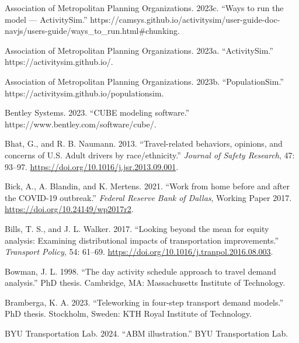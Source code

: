 \documentclass[fancy, twoside, mastersfancy, ms]{byuthesis}
\newlength{\cslhangindent}
\newenvironment{CSLReferences}[2] %
 {\begin{list}{}{%
  \setlength{\itemindent}{0pt}
  \setlength{\leftmargin}{0pt}
  \setlength{\parsep}{0pt}
  \ifodd #1
   \setlength{\leftmargin}{\cslhangindent}
   \setlength{\itemindent}{-1\cslhangindent}
  \fi
  \setlength{\itemsep}{#2\baselineskip}}}
 {\end{list}}
\begin{document}
\label{refs}
\begin{CSLReferences}{1}{0}
Association of Metropolitan Planning Organizations. 2023c. {``Ways to
run the model --- {ActivitySim}.''}
https://camsys.github.io/activitysim/user-guide-doc-navjs/users-guide/ways\_to\_run.html\#chunking.

Association of Metropolitan Planning Organizations. 2023a.
{``{ActivitySim}.''} https://activitysim.github.io/.

Association of Metropolitan Planning Organizations. 2023b.
{``{PopulationSim}.''} https://activitysim.github.io/populationsim.

Bentley Systems. 2023. {``{CUBE} modeling software.''}
https://www.bentley.com/software/cube/.

Bhat, G., and R. B. Naumann. 2013. {``Travel-related behaviors,
opinions, and concerns of {U}.{S}. Adult drivers by race/ethnicity.''}
\emph{Journal of Safety Research}, 47: 93--97.
\url{https://doi.org/10.1016/j.jsr.2013.09.001}.

Bick, A., A. Blandin, and K. Mertens. 2021. {``Work from home before and
after the {COVID-19} outbreak.''} \emph{Federal Reserve Bank of Dallas},
Working Paper 2017. \url{https://doi.org/10.24149/wp2017r2}.

Bills, T. S., and J. L. Walker. 2017. {``Looking beyond the mean for
equity analysis: Examining distributional impacts of transportation
improvements.''} \emph{Transport Policy}, 54: 61--69.
\url{https://doi.org/10.1016/j.tranpol.2016.08.003}.

Bowman, J. L. 1998. {``The day activity schedule approach to travel
demand analysis.''} PhD thesis. Cambridge, MA: Massachusetts Institute
of Technology.

Bramberga, K. A. 2023. {``Teleworking in four-step transport demand
models.''} PhD thesis. Stockholm, Sweden: KTH Royal Institute of
Technology.

BYU Transportation Lab. 2024. {``{ABM} illustration.''} BYU
Transportation Lab.


\end{CSLReferences}
\end{document}
